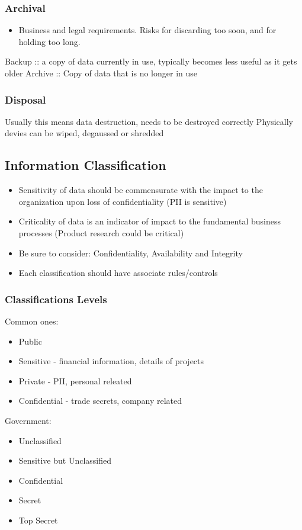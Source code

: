 \documentclass[11pt]{article}
\begin{document}
\subsubsection{Archival}
\label{sec:org928a7fd}
\begin{itemize}
\item Business and legal requirements. Risks for discarding too soon, and for holding too long.
\end{itemize}
Backup :: a copy of data currently in use, typically becomes less useful as it gets older
Archive :: Copy of data that is no longer in use
\subsubsection{Disposal}
\label{sec:org634b37b}
Usually this means data destruction, needs to be destroyed correctly
Physically devies can be wiped, degaussed or shredded
\subsection{Information Classification}
\label{sec:org08283b2}
\begin{itemize}
\item Sensitivity of data should be commensurate with the impact to the organization upon loss of confidentiality (PII is sensitive)
\item Criticality of data is an indicator of impact to the fundamental business processes (Product research could be critical)
\item Be sure to consider: Confidentiality, Availability and Integrity
\item Each classification should have associate rules/controls
\end{itemize}
\subsubsection{Classifications Levels}
\label{sec:org66dc0fc}
Common ones:
\begin{itemize}
\item Public
\item Sensitive - financial information, details of projects
\item Private - PII, personal releated
\item Confidential - trade secrets, company related
\end{itemize}

Government:
\begin{itemize}
\item Unclassified
\item Sensitive but Unclassified
\item Confidential
\item Secret
\item Top Secret
\end{itemize}
\end{document}
